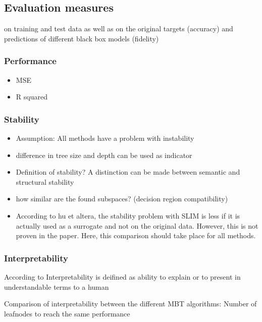 \subsection{Evaluation measures}
on training and test data as well as on the original targets (accuracy) and predictions of different black box models (fidelity)
\subsubsection{Performance}
\begin{itemize}
    \item MSE
    \item R squared
\end{itemize}

\subsubsection{Stability}

\begin{itemize}
    \item Assumption: All methods have a problem with instability \citep{Fokkema.2020}
    \item difference in tree size and depth can be used as indicator \citep{Wang.2018}
    \item Definition of stability? A distinction can be made between semantic and structural stability \citep{Wang.2018}
    \item how similar are the found subspaces? (decision region compatibility) \citep{Wang.2018}

    \item According to hu et altera, the stability problem with SLIM is less if it is actually used as a surrogate and not on the original data. However, this is not proven in the paper. Here, this comparison should take place for all methods.




\end{itemize}






\subsubsection{Interpretability}
According to \citet{DoshiVelez.2017} Interpretability is deifined as ability to explain or to present in understandable
terms to a human


Comparison of interpretability between the different MBT algorithms:
Number of leafnodes to reach the same performance


